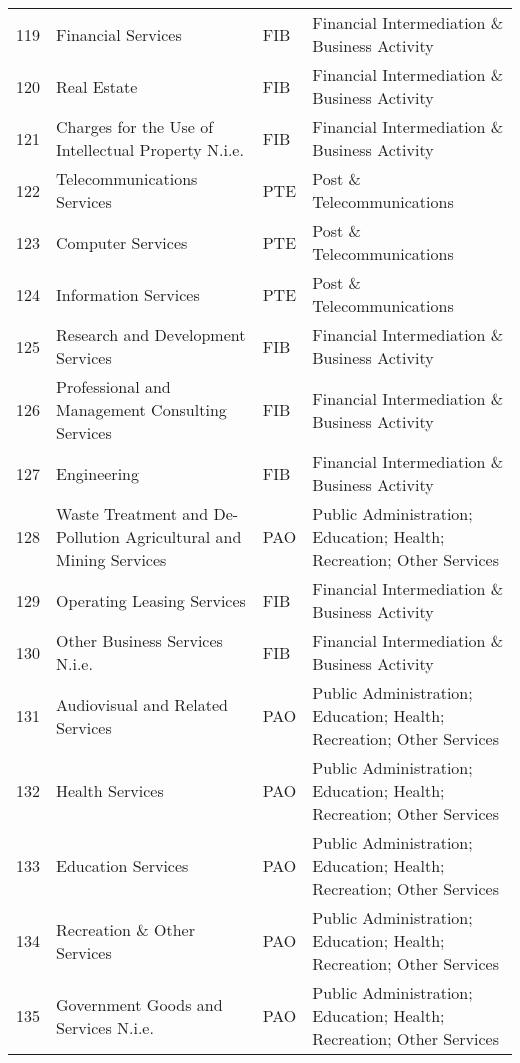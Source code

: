 \documentclass[a4paper]{article}
\begin{document}
\begin{table}[ht]
{\begin{tabular}{rlll}
  119 & Financial Services & FIB & Financial Intermediation \& Business Activity \\ 
  120 & Real Estate & FIB & Financial Intermediation \& Business Activity \\ 
  121 & Charges for the Use of Intellectual Property N.i.e. & FIB & Financial Intermediation \& Business Activity \\ 
  122 & Telecommunications Services & PTE & Post \& Telecommunications \\ 
  123 & Computer Services & PTE & Post \& Telecommunications \\ 
  124 & Information Services & PTE & Post \& Telecommunications \\ 
  125 & Research and Development Services & FIB & Financial Intermediation \& Business Activity \\ 
  126 & Professional and Management Consulting Services & FIB & Financial Intermediation \& Business Activity \\ 
  127 & Engineering & FIB & Financial Intermediation \& Business Activity \\ 
  128 & Waste Treatment and De-Pollution Agricultural and Mining Services & PAO & Public Administration; Education; Health; Recreation; Other Services \\ 
  129 & Operating Leasing Services & FIB & Financial Intermediation \& Business Activity \\ 
  130 & Other Business Services N.i.e. & FIB & Financial Intermediation \& Business Activity \\ 
  131 & Audiovisual and Related Services & PAO & Public Administration; Education; Health; Recreation; Other Services \\ 
  132 & Health Services & PAO & Public Administration; Education; Health; Recreation; Other Services \\ 
  133 & Education Services & PAO & Public Administration; Education; Health; Recreation; Other Services \\ 
  134 & Recreation \& Other Services & PAO & Public Administration; Education; Health; Recreation; Other Services \\ 
  135 & Government Goods and Services N.i.e. & PAO & Public Administration; Education; Health; Recreation; Other Services \\ 
   \bottomrule
\end{tabular}
}
\end{table}
\FloatBarrier
\end{document}
